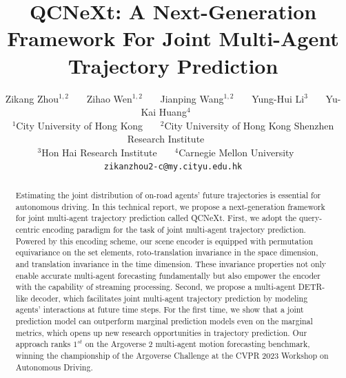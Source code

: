 \documentclass[10pt,twocolumn,letterpaper]{article}
\begin{document}
\title{QCNeXt: A Next-Generation Framework For Joint Multi-Agent Trajectory Prediction}

\author{
Zikang Zhou$^{1, 2}$~~~
Zihao Wen$^{1, 2}$~~~
Jianping Wang$^{1, 2}$~~~
Yung-Hui Li$^3$~~~
Yu-Kai Huang$^4$~~~
\\
$^1$City University of Hong Kong~~~
$^2$City University of Hong Kong Shenzhen Research Institute~~~\\
$^3$Hon Hai Research Institute~~~
$^4$Carnegie Mellon University~~~
\\
{\tt\small zikanzhou2-c@my.cityu.edu.hk}\\
}
\maketitle

\begin{abstract}
Estimating the joint distribution of on-road agents' future trajectories is essential for autonomous driving. In this technical report, we propose a next-generation framework for joint multi-agent trajectory prediction called QCNeXt. First, we adopt the query-centric encoding paradigm for the task of joint multi-agent trajectory prediction. Powered by this encoding scheme, our scene encoder is equipped with permutation equivariance on the set elements, roto-translation invariance in the space dimension, and translation invariance in the time dimension. These invariance properties not only enable accurate multi-agent forecasting fundamentally but also empower the encoder with the capability of streaming processing. Second, we propose a multi-agent DETR-like decoder, which facilitates joint multi-agent trajectory prediction by modeling agents' interactions at future time steps. For the first time, we show that a joint prediction model can outperform marginal prediction models even on the marginal metrics, which opens up new research opportunities in trajectory prediction. Our approach ranks $1^{st}$ on the Argoverse 2 multi-agent motion forecasting benchmark, winning the championship of the Argoverse Challenge at the CVPR 2023 Workshop on Autonomous Driving.


\end{abstract}

\end{document}
